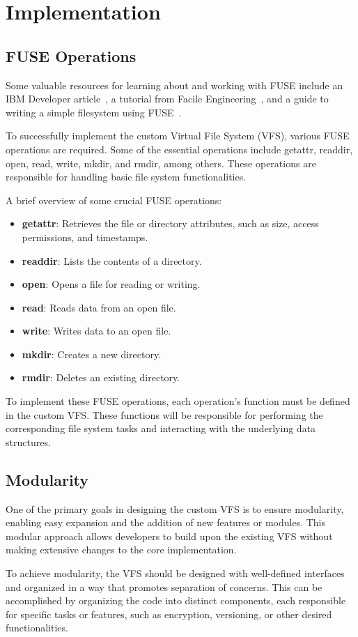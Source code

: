 \chapter{Implementation}
\label{chap:implementation}

\section{FUSE Operations}\label{sec:fuse-ops}

Some valuable resources for learning about and working with FUSE include an IBM Developer article~\cite{ibm_fuse}, a tutorial from Facile Engineering~\cite{facile_fuse}, and a guide to writing a simple filesystem using FUSE~\cite{maastaar_fuse}.

To successfully implement the custom Virtual File System (VFS), various FUSE operations are required.
Some of the essential operations include getattr, readdir, open, read, write, mkdir, and rmdir, among others.
These operations are responsible for handling basic file system functionalities.

A brief overview of some crucial FUSE operations:

\begin{itemize}
    \item \textbf{getattr}: Retrieves the file or directory attributes, such as size, access permissions, and timestamps.
    \item \textbf{readdir}: Lists the contents of a directory.
    \item \textbf{open}: Opens a file for reading or writing.
    \item \textbf{read}: Reads data from an open file.
    \item \textbf{write}: Writes data to an open file.
    \item \textbf{mkdir}: Creates a new directory.
    \item \textbf{rmdir}: Deletes an existing directory.
    \xxx{\ldots}
\end{itemize}

To implement these FUSE operations, each operation's function must be defined in the custom VFS\@.
These functions will be responsible for performing the corresponding file system tasks and interacting with the underlying data structures.


\section{Modularity}\label{sec:modularity}

One of the primary goals in designing the custom VFS is to ensure modularity, enabling easy expansion and the addition of new features or modules.
This modular approach allows developers to build upon the existing VFS without making extensive changes to the core implementation.

To achieve modularity, the VFS should be designed with well-defined interfaces and organized in a way that promotes separation of concerns.
This can be accomplished by organizing the code into distinct components, each responsible for specific tasks or features, such as encryption, versioning, or other desired functionalities.